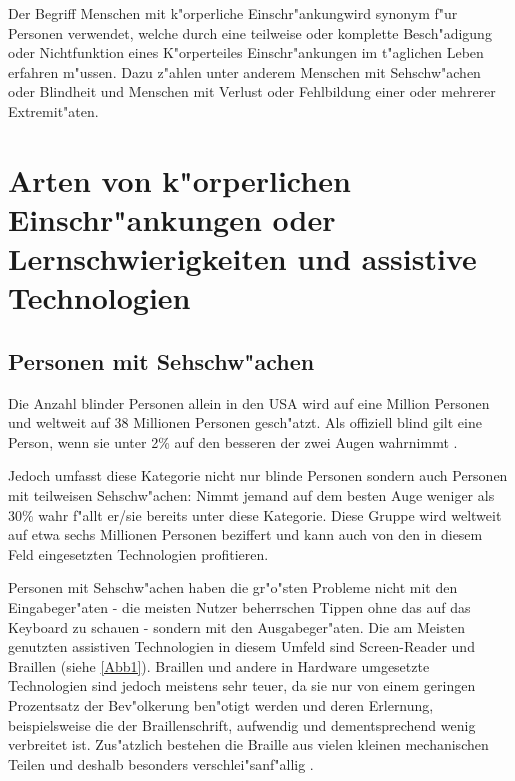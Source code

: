 \documentclass[a4paper,bibtotoc,oneside]{scrbook}
\begin{document}
Der Begriff \glqq Menschen mit k"orperliche Einschr"ankung\grqq wird synonym f"ur Personen verwendet, welche durch eine teilweise oder komplette Besch"adigung oder Nichtfunktion eines K"orperteiles Einschr"ankungen im t"aglichen Leben erfahren m"ussen. Dazu z"ahlen unter anderem Menschen mit Sehschw"achen oder Blindheit und Menschen mit Verlust oder Fehlbildung einer oder mehrerer Extremit"aten.

\chapter{Arten von k"orperlichen Einschr"ankungen oder Lernschwierigkeiten
 und assistive Technologien}

\section{Personen mit Sehschw"achen}
Die Anzahl blinder Personen allein in den USA wird auf eine Million Personen und weltweit auf 38 Millionen Personen gesch"atzt\cite[S. 1]{screen_read}. Als offiziell blind gilt eine Person, wenn sie unter 2\% auf den besseren der zwei Augen wahrnimmt \cite[S. 12]{understand_acc}. 

Jedoch umfasst diese Kategorie nicht nur blinde Personen sondern auch Personen mit teilweisen Sehschw"achen: Nimmt jemand auf dem besten Auge weniger als 30\% wahr f"allt er/sie bereits unter diese Kategorie\cite[S. 12]{understand_acc}.  Diese Gruppe wird weltweit auf etwa sechs Millionen Personen beziffert\cite[S. 249]{screen_read_frust} und kann auch von den in diesem Feld eingesetzten Technologien profitieren.

Personen mit Sehschw"achen haben die gr"o"sten Probleme nicht mit den Eingabeger"aten - die meisten Nutzer beherrschen Tippen ohne das auf das Keyboard zu schauen - sondern mit den Ausgabeger"aten. Die am Meisten genutzten assistiven Technologien in diesem Umfeld sind Screen-Reader und Braillen (siehe \ref{Abb1}). Braillen und andere in Hardware umgesetzte Technologien sind jedoch meistens sehr teuer, da sie nur von einem geringen Prozentsatz der Bev"olkerung ben"otigt werden und deren Erlernung, beispielsweise die der Braillenschrift, aufwendig und dementsprechend wenig verbreitet ist\cite[S. 249-250]{screen_read_frust}.
Zus"atzlich bestehen die Braille aus vielen kleinen mechanischen Teilen und deshalb besonders verschlei"sanf"allig \cite[S. 11]{barr_webd}.
\end{document}
